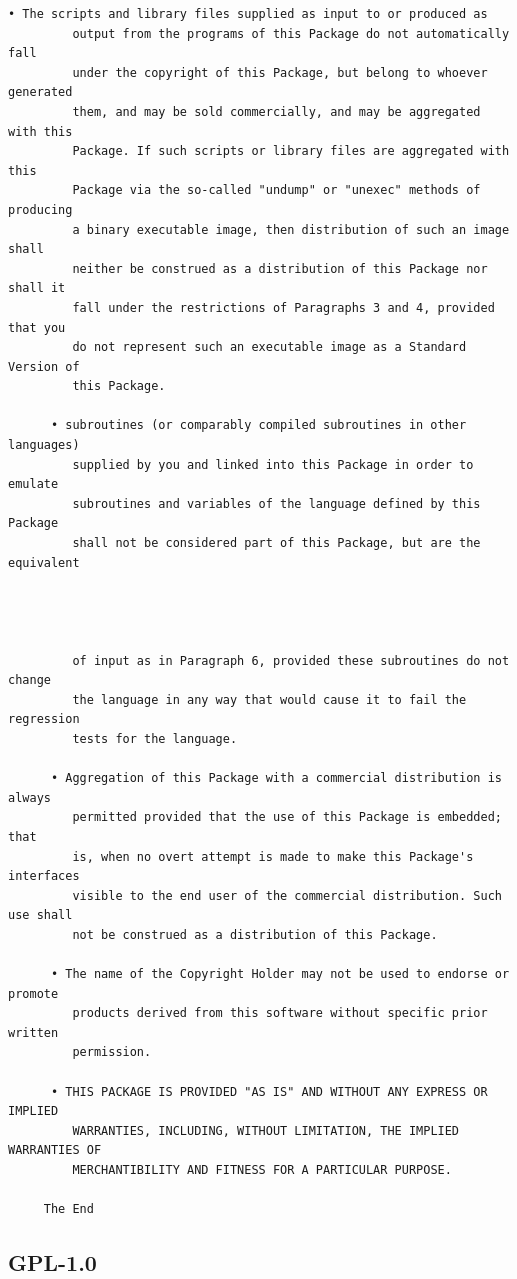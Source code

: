 \begin{lstlisting}[basicstyle=\ttfamily\footnotesize,breaklines=true]
      • The scripts and library files supplied as input to or produced as
         output from the programs of this Package do not automatically fall
         under the copyright of this Package, but belong to whoever generated
         them, and may be sold commercially, and may be aggregated with this
         Package. If such scripts or library files are aggregated with this
         Package via the so-called "undump" or "unexec" methods of producing
         a binary executable image, then distribution of such an image shall
         neither be construed as a distribution of this Package nor shall it
         fall under the restrictions of Paragraphs 3 and 4, provided that you
         do not represent such an executable image as a Standard Version of
         this Package.

      • subroutines (or comparably compiled subroutines in other languages)
         supplied by you and linked into this Package in order to emulate
         subroutines and variables of the language defined by this Package
         shall not be considered part of this Package, but are the equivalent




         of input as in Paragraph 6, provided these subroutines do not change
         the language in any way that would cause it to fail the regression
         tests for the language.

      • Aggregation of this Package with a commercial distribution is always
         permitted provided that the use of this Package is embedded; that
         is, when no overt attempt is made to make this Package's interfaces
         visible to the end user of the commercial distribution. Such use shall
         not be construed as a distribution of this Package.

      • The name of the Copyright Holder may not be used to endorse or promote
         products derived from this software without specific prior written
         permission.

      • THIS PACKAGE IS PROVIDED "AS IS" AND WITHOUT ANY EXPRESS OR IMPLIED
         WARRANTIES, INCLUDING, WITHOUT LIMITATION, THE IMPLIED WARRANTIES OF
         MERCHANTIBILITY AND FITNESS FOR A PARTICULAR PURPOSE.

     The End
\end{lstlisting}

\subsection{GPL-1.0}
